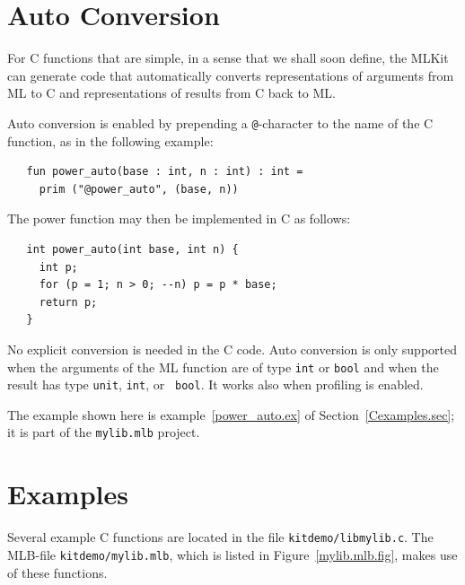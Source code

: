 \documentclass[12pt]{book}
\begin{document}
\section{Auto Conversion} 
% 
\label{auto_conversion.sec}
For C functions that are simple, in a sense
that we shall soon define, the MLKit can generate code that
automatically converts representations of arguments from ML to C and
representations of results from C back to ML.

Auto conversion is enabled by prepending a {\tt @}-character to
the name of the C function, as in the following example:
\begin{verbatim}
   fun power_auto(base : int, n : int) : int = 
     prim ("@power_auto", (base, n))
\end{verbatim}

\noindent
The power function may then be implemented in C as follows:
\begin{verbatim}
   int power_auto(int base, int n) {
     int p;
     for (p = 1; n > 0; --n) p = p * base;
     return p;
   }
\end{verbatim}

\noindent
No explicit conversion is needed in the C code. Auto conversion is only
supported when the arguments of the ML function are of type {\tt int} or
{\tt bool} and when the result has type {\tt unit}, {\tt int}, or {\tt
  bool}. It works also when profiling is enabled.

The example shown here is example~\ref{power_auto.ex} of
Section~\ref{Cexamples.sec}; it is part of the \verb|mylib.mlb|
project.

\section{Examples\label{Cexamples.sec}}
%
%
%
Several example C functions are located in the file
\verb|kitdemo/libmylib.c|. The MLB-file \verb|kitdemo/mylib.mlb|, which
is listed in Figure~\ref{mylib.mlb.fig}, makes use of these functions.
\end{document}
